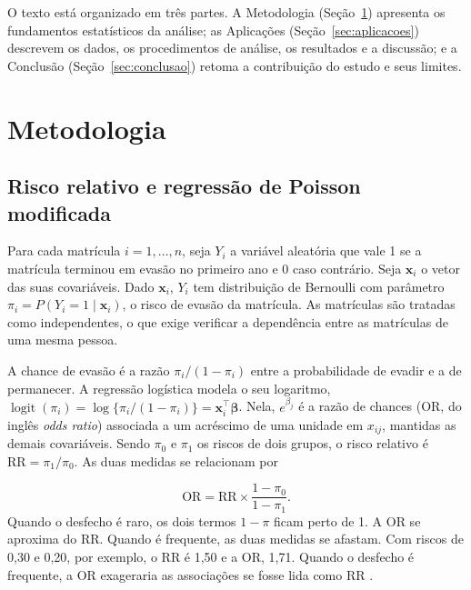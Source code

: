\documentclass[12pt,a4paper]{article}
\begin{document}
O texto está organizado em três partes. A Metodologia (Seção~\ref{sec:fundamentacao}) apresenta os fundamentos estatísticos da análise; as Aplicações (Seção~\ref{sec:aplicacoes}) descrevem os dados, os procedimentos de análise, os resultados e a discussão; e a Conclusão (Seção~\ref{sec:conclusao}) retoma a contribuição do estudo e seus limites.

\section{Metodologia}
\label{sec:fundamentacao}
\label{sec:fund-estatistica}

\subsection{Risco relativo e regressão de Poisson modificada}
\label{sec:fund-poisson}

Para cada matrícula $i = 1, \dots, n$, seja $Y_i$ a variável aleatória que vale 1 se a matrícula terminou em evasão no primeiro ano e 0 caso contrário. Seja $\mathbf{x}_i$ o vetor das suas covariáveis. Dado $\mathbf{x}_i$, $Y_i$ tem distribuição de Bernoulli com parâmetro $\pi_i = P(Y_i = 1 \mid \mathbf{x}_i)$, o risco de evasão da matrícula. As matrículas são tratadas como independentes, o que exige verificar a dependência entre as matrículas de uma mesma pessoa.

A chance de evasão é a razão $\pi_i/(1-\pi_i)$ entre a probabilidade de evadir e a de permanecer. A regressão logística modela o seu logaritmo, $\operatorname{logit}(\pi_i) = \log\{\pi_i/(1-\pi_i)\} = \mathbf{x}_i^\top\boldsymbol{\beta}$. Nela, $e^{\beta_j}$ é a razão de chances (OR, do inglês \textit{odds ratio}) associada a um acréscimo de uma unidade em $x_{ij}$, mantidas as demais covariáveis. Sendo $\pi_0$ e $\pi_1$ os riscos de dois grupos, o risco relativo é $\text{RR} = \pi_1/\pi_0$. As duas medidas se relacionam por

\begin{equation}
  \text{OR} = \text{RR} \times \frac{1 - \pi_0}{1 - \pi_1}.
\end{equation}
Quando o desfecho é raro, os dois termos $1 - \pi$ ficam perto de 1. A OR se aproxima do RR. Quando é frequente, as duas medidas se afastam. Com riscos de 0,30 e 0,20, por exemplo, o RR é 1,50 e a OR, 1,71. Quando o desfecho é frequente, a OR exageraria as associações se fosse lida como RR \citep{zou2004modified}.
\end{document}
